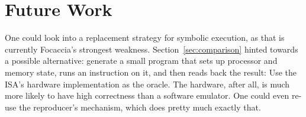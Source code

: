 \chapter{Future Work}

One could look into a replacement strategy for symbolic execution, as that is currently Focaccia's strongest weakness.
Section~\ref{sec:comparison} hinted towards a possible alternative: generate a small program that sets up processor and
memory state, runs an instruction on it, and then reads back the result: Use the ISA's hardware implementation as the
oracle. The hardware, after all, is much more likely to have high correctness than a software emulator. One could even
re-use the reproducer's mechanism, which does pretty much exactly that.
